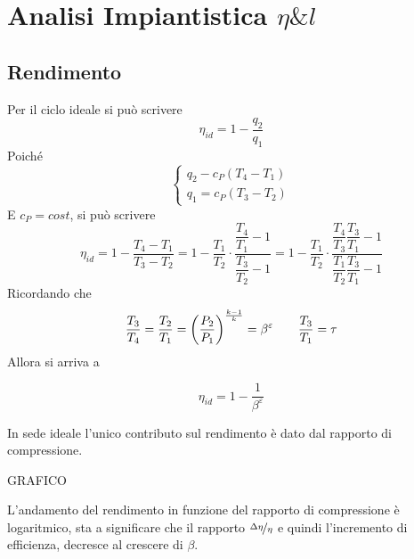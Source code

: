 \section{Analisi Impiantistica $\eta\& l$}
\subsection{Rendimento}
\begin{adjustwidth}{2in}{}
	Per il ciclo ideale si può scrivere 
	\[\eta_{id} = 1- \dfrac{q_2}{q_1}\]
	Poiché 
	\[\begin{cases}
		q_2 - c_P(T_4-T_1) \\
		q_1 = c_P(T_3-T_2)		
	\end{cases}\]
	E $c_P = cost$, si può scrivere 
	\[\eta_{id} = 1- \dfrac{T_4-T_1}{T_3-T_2} = 1-\dfrac{T_1}{T_2} \cdot \dfrac{\dfrac{T_4}{T_1} -1}{\dfrac{T_3}{T_2}-1} = 1-\dfrac{T_1}{T_2} \cdot \dfrac{\dfrac{T_4}{T_3}\dfrac{T_3}{T_1}-1}{\dfrac{T_1}{T_2}\dfrac{T_3}{T_1}-1}\]
	Ricordando che 
	\[\dfrac{T_3}{T_4} = \dfrac{T_2}{T_1} = \left(\dfrac{P_2}{P_1}\right)^{k-1\over k} =  \beta^\varepsilon\qquad\dfrac{T_3}{T_1}=\tau\]
	Allora si arriva a 
	
	\begin{equation} \label{eq:2.1}
		\boxed{\eta_{id} = 1-\dfrac{1}{\beta^\varepsilon}}
	\end{equation}
	
	In sede ideale l'unico contributo sul rendimento è dato dal rapporto di compressione.
	
	GRAFICO
	
	L'andamento del rendimento in funzione del rapporto di compressione è logaritmico, sta a significare che il rapporto $\nicefrac{\Delta \eta}{\eta}$ e quindi l'incremento di efficienza, decresce al crescere di $\beta$. 
\end{adjustwidth}

